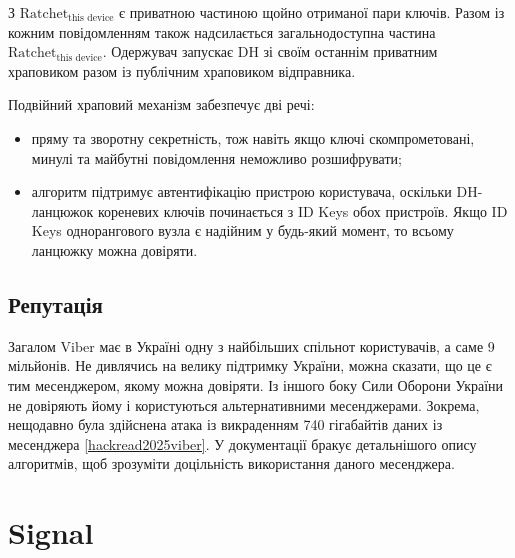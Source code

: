 З $\text{Ratchet}_\text{this device}$ є приватною частиною щойно отриманої пари ключів. Разом із кожним повідомленням також надсилається загальнодоступна частина $\text{Ratchet}_{\text{this device}}$. Одержувач запускає DH зі своїм останнім приватним храповиком разом із публічним храповиком відправника.

Подвійний храповий механізм забезпечує дві речі: 
\begin{itemize}
    \item пряму та зворотну секретність, тож навіть якщо ключі скомпрометовані, минулі та майбутні повідомлення неможливо розшифрувати;
    \item алгоритм підтримує автентифікацію пристрою користувача, оскільки DH-ланцюжок кореневих ключів починається з ID Keys обох пристроїв. Якщо ID Keys однорангового вузла є надійним у будь-який момент, то всьому ланцюжку можна довіряти.
\end{itemize}

\subsection{Репутація}

Загалом Viber має в Україні одну з найбільших спільнот користувачів, а саме 9 мільйонів. Не дивлячись на велику підтримку України, можна сказати, що це є тим месенджером, якому можна довіряти. Із іншого боку Сили Оборони України не довіряють йому і користуються альтернативними месенджерами. Зокрема, нещодавно була здійснена атака із викраденням 740 гігабайтів даних із месенджера \ref{hackread2025viber}. У документації бракує детальнішого опису алгоритмів, щоб зрозуміти доцільність використання даного месенджера.


\section{Signal}

